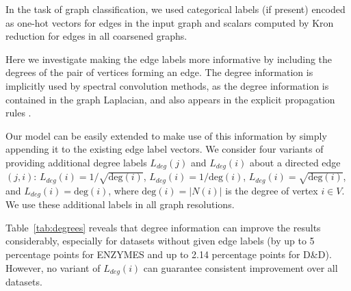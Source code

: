 \documentclass[10pt,twocolumn,letterpaper]{article}
\begin{document}
In the task of graph classification, we used categorical labels (if present) encoded as one-hot vectors for edges in the input graph and scalars computed by Kron reduction for edges in all coarsened graphs. 

Here we investigate making the edge labels more informative by including the degrees of the pair of vertices forming an edge. The degree information is implicitly used by spectral convolution methods, as the degree information is contained in the graph Laplacian, and also appears in the explicit propagation rules \cite{kipf, dcnn}. 

Our model can be easily extended to make use of this information by simply appending it to the existing edge label vectors. We consider four variants of providing additional degree labels $L_{deg}(j)$ and  $L_{deg}(i)$ about a directed edge $(j,i)$: $L_{deg}(i) = 1/\sqrt{\mathrm{deg}(i)}$, $L_{deg}(i) = 1/\mathrm{deg}(i)$, $L_{deg}(i) = \sqrt{\mathrm{deg}(i)}$, and $L_{deg}(i) = \mathrm{deg}(i)$, where $\mathrm{deg}(i) = |N(i)|$ is the degree of vertex $i\in V$. We use these additional labels in all graph resolutions.



Table~\ref{tab:degrees} reveals that degree information can improve the results considerably, especially for datasets without given edge labels (by up to 5 percentage points for ENZYMES and up to 2.14 percentage points for D{\&}D). However, no variant of $L_{deg}(i)$ can guarantee consistent improvement over all datasets.



\begin{table}[bt]
\centering
{}
\vspace{1ex}
\caption{\label{tab:degrees}
The effect in mean classification accuracy of adding vertex degrees to edge labels (improvements in italics).}
\end{table}
\end{document}
